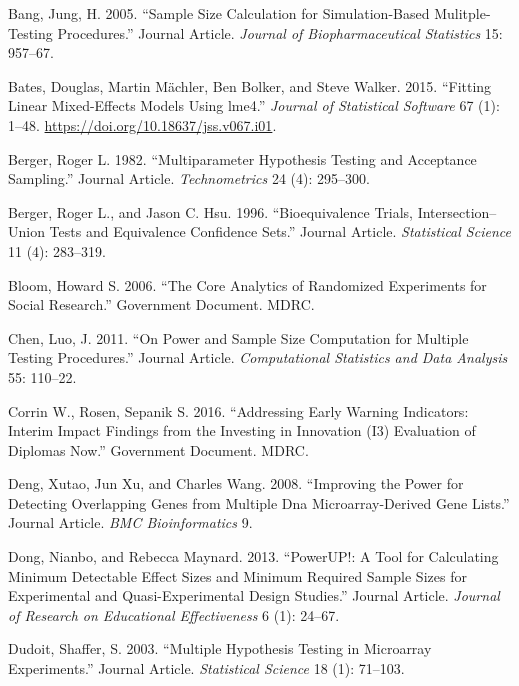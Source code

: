\documentclass[
]{article}
\newlength{\cslhangindent}
\newenvironment{cslreferences}%
  {\setlength{\parindent}{0pt}%
  \everypar{\setlength{\hangindent}{\cslhangindent}}\ignorespaces}%
  {\par}
\begin{document}
\hypertarget{refs}{}
\begin{cslreferences}
\leavevmode\hypertarget{ref-RN33089}{}%
Bang, Jung, H. 2005. ``Sample Size Calculation for Simulation-Based
Mulitple-Testing Procedures.'' Journal Article. \emph{Journal of
Biopharmaceutical Statistics} 15: 957--67.

\leavevmode\hypertarget{ref-lme4}{}%
Bates, Douglas, Martin Mächler, Ben Bolker, and Steve Walker. 2015.
``Fitting Linear Mixed-Effects Models Using lme4.'' \emph{Journal of
Statistical Software} 67 (1): 1--48.
\url{https://doi.org/10.18637/jss.v067.i01}.

\leavevmode\hypertarget{ref-Berger1982}{}%
Berger, Roger L. 1982. ``Multiparameter Hypothesis Testing and
Acceptance Sampling.'' Journal Article. \emph{Technometrics} 24 (4):
295--300.

\leavevmode\hypertarget{ref-Berger1996}{}%
Berger, Roger L., and Jason C. Hsu. 1996. ``Bioequivalence Trials,
Intersection--Union Tests and Equivalence Confidence Sets.'' Journal
Article. \emph{Statistical Science} 11 (4): 283--319.

\leavevmode\hypertarget{ref-RN27978}{}%
Bloom, Howard S. 2006. ``The Core Analytics of Randomized Experiments
for Social Research.'' Government Document. MDRC.

\leavevmode\hypertarget{ref-RN23882}{}%
Chen, Luo, J. 2011. ``On Power and Sample Size Computation for Multiple
Testing Procedures.'' Journal Article. \emph{Computational Statistics
and Data Analysis} 55: 110--22.

\leavevmode\hypertarget{ref-DNREPORT}{}%
Corrin W., Rosen, Sepanik S. 2016. ``Addressing Early Warning
Indicators: Interim Impact Findings from the Investing in Innovation
(I3) Evaluation of Diplomas Now.'' Government Document. MDRC.

\leavevmode\hypertarget{ref-Deng2008}{}%
Deng, Xutao, Jun Xu, and Charles Wang. 2008. ``Improving the Power for
Detecting Overlapping Genes from Multiple Dna Microarray-Derived Gene
Lists.'' Journal Article. \emph{BMC Bioinformatics} 9.

\leavevmode\hypertarget{ref-RN4473}{}%
Dong, Nianbo, and Rebecca Maynard. 2013. ``PowerUP!: A Tool for
Calculating Minimum Detectable Effect Sizes and Minimum Required Sample
Sizes for Experimental and Quasi-Experimental Design Studies.'' Journal
Article. \emph{Journal of Research on Educational Effectiveness} 6 (1):
24--67.

\leavevmode\hypertarget{ref-RN23878}{}%
Dudoit, Shaffer, S. 2003. ``Multiple Hypothesis Testing in Microarray
Experiments.'' Journal Article. \emph{Statistical Science} 18 (1):
71--103.


\end{cslreferences}
\end{document}
